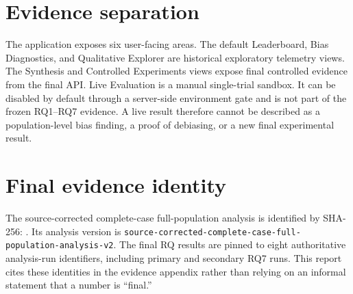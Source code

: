 \section{Evidence separation}

The application exposes six user-facing areas. The default Leaderboard, Bias Diagnostics, and Qualitative Explorer are historical exploratory telemetry views. The Synthesis and Controlled Experiments views expose final controlled evidence from the final API. Live Evaluation is a manual single-trial sandbox. It can be disabled by default through a server-side environment gate and is not part of the frozen RQ1--RQ7 evidence. A live result therefore cannot be described as a population-level bias finding, a proof of debiasing, or a new final experimental result.

\section{Final evidence identity}

The source-corrected complete-case full-population analysis is identified by SHA-256:
\newline {\footnotesize \artifacthash}.
Its analysis version is \texttt{source-corrected-complete-case-full-population-analysis-v2}. The final RQ results are pinned to eight authoritative analysis-run identifiers, including primary and secondary RQ7 runs. This report cites these identities in the evidence appendix rather than relying on an informal statement that a number is ``final.''
